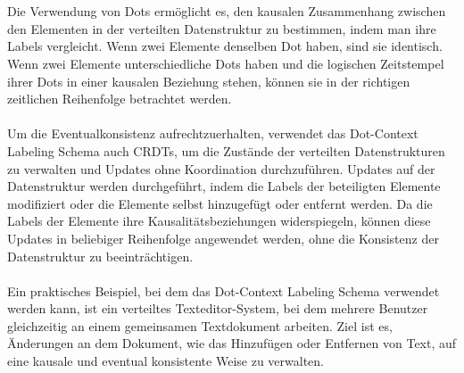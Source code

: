 \documentclass[../vs-script-first-v01.tex]{subfiles}
\begin{document}
\\\\
Die Verwendung von Dots ermöglicht es, den kausalen Zusammenhang zwischen den Elementen in der verteilten Datenstruktur zu bestimmen, indem man ihre Labels vergleicht. Wenn zwei Elemente denselben Dot haben, sind sie identisch. Wenn zwei Elemente unterschiedliche Dots haben und die logischen Zeitstempel ihrer Dots in einer kausalen Beziehung stehen, können sie in der richtigen zeitlichen Reihenfolge betrachtet werden.
\\\\
Um die Eventualkonsistenz aufrechtzuerhalten, verwendet das Dot-Context Labeling Schema auch CRDTs, um die Zustände der verteilten Datenstrukturen zu verwalten und Updates ohne Koordination durchzuführen. Updates auf der Datenstruktur werden durchgeführt, indem die Labels der beteiligten Elemente modifiziert oder die Elemente selbst hinzugefügt oder entfernt werden. Da die Labels der Elemente ihre Kausalitätsbeziehungen widerspiegeln, können diese Updates in beliebiger Reihenfolge angewendet werden, ohne die Konsistenz der Datenstruktur zu beeinträchtigen.
\\\\
Ein praktisches Beispiel, bei dem das Dot-Context Labeling Schema verwendet werden kann, ist ein verteiltes Texteditor-System, bei dem mehrere Benutzer gleichzeitig an einem gemeinsamen Textdokument arbeiten. Ziel ist es, Änderungen an dem Dokument, wie das Hinzufügen oder Entfernen von Text, auf eine kausale und eventual konsistente Weise zu verwalten.
\end{document}
